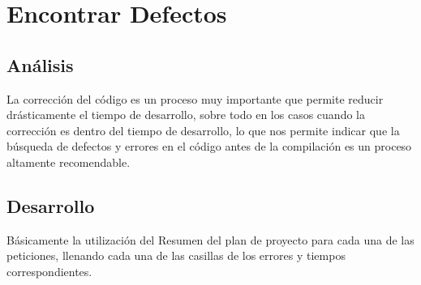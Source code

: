 \documentclass[a4paper,12pt,openany,oneside]{book}
\begin{document}
\chapter{Encontrar Defectos}
\thispagestyle{empty}
\section{Análisis}
La corrección del código es un proceso muy importante que permite reducir drásticamente el tiempo de desarrollo, sobre todo en los casos cuando la corrección es dentro del tiempo de desarrollo, lo que nos permite indicar que la búsqueda de defectos y errores en el código antes de la compilación es un proceso altamente recomendable.
\section{Desarrollo}
Básicamente la utilización del Resumen del plan de proyecto para cada una de las peticiones, llenando cada una de las casillas de los errores y tiempos correspondientes.
\end{document}

